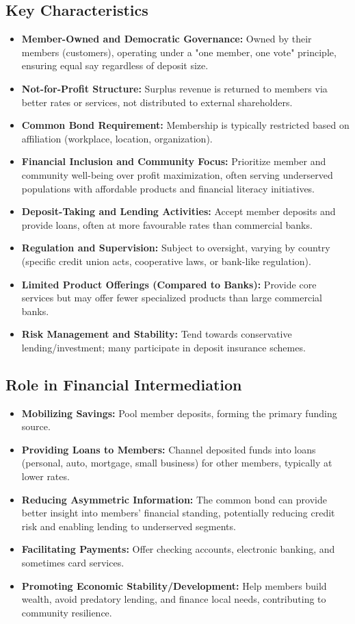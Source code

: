 \subsection{Key Characteristics}
\begin{itemize}
    \item \textbf{Member-Owned and Democratic Governance:} Owned by their members (customers), operating under a "one member, one vote" principle, ensuring equal say regardless of deposit size.
    \item \textbf{Not-for-Profit Structure:} Surplus revenue is returned to members via better rates or services, not distributed to external shareholders.
    \item \textbf{Common Bond Requirement:} Membership is typically restricted based on affiliation (workplace, location, organization).
    \item \textbf{Financial Inclusion and Community Focus:} Prioritize member and community well-being over profit maximization, often serving underserved populations with affordable products and financial literacy initiatives.
    \item \textbf{Deposit-Taking and Lending Activities:} Accept member deposits and provide loans, often at more favourable rates than commercial banks.
    \item \textbf{Regulation and Supervision:} Subject to oversight, varying by country (specific credit union acts, cooperative laws, or bank-like regulation).
    \item \textbf{Limited Product Offerings (Compared to Banks):} Provide core services but may offer fewer specialized products than large commercial banks.
    \item \textbf{Risk Management and Stability:} Tend towards conservative lending/investment; many participate in deposit insurance schemes.
\end{itemize}

\subsection{Role in Financial Intermediation}
\begin{itemize}
    \item \textbf{Mobilizing Savings:} Pool member deposits, forming the primary funding source.
    \item \textbf{Providing Loans to Members:} Channel deposited funds into loans (personal, auto, mortgage, small business) for other members, typically at lower rates.
    \item \textbf{Reducing Asymmetric Information:} The common bond can provide better insight into members' financial standing, potentially reducing credit risk and enabling lending to underserved segments.
    \item \textbf{Facilitating Payments:} Offer checking accounts, electronic banking, and sometimes card services.
    \item \textbf{Promoting Economic Stability/Development:} Help members build wealth, avoid predatory lending, and finance local needs, contributing to community resilience.
\end{itemize}

